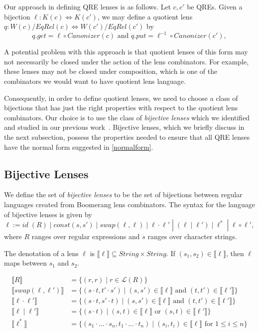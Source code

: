 \documentclass{svproc}
\newcommand{\sep}{\ensuremath{\; | \;}}
\newcommand{\canonizer}{\ensuremath{\mathit{Canonizer}}}
\begin{document}
Our approach in defining QRE lenses is as follows. Let $c, c'$ be QREs. Given a
bijection $\ell : K(c) \Leftrightarrow K(c')$, we may define a quotient lens $q
: W(c)/EqRel(c) \Leftrightarrow W(c')/EqRel(c')$ by
\begin{equation}\label{normalform}
q.get = \ell \circ \canonizer(c) \text{ and } q.put = \ell^{-1} \circ
\canonizer(c'),
\end{equation}

A potential problem with this approach is that quotient lenses of this form may
not necessarily be closed under the action of the lens combinators. For
example, these lenses may not be closed under composition, which is one of the
combinators we would want to have quotient lens language.

Consequently, in order to define quotient lenses, we need to choose a class of
bijections that has just the right properties with respect to the quotient
lens combinators. Our choice is to use the class of \textit{bijective
lenses} which we identified and studied in our previous work~\cite{popl18}.
Bijective lenses, which we briefly discuss in the next subsection, possess
the properties needed to ensure that all QRE lenses have the normal form
suggested in \cref{normalform}.

\subsection{Bijective Lenses}
We define the set of \textit{bijective lenses} to be the set of bijections
between regular languages created from Boomerang lens combinators.
The syntax for the language of bijective lenses is given by
$$\ell := \mathit{id} \; (R) \sep const(s, s') \sep  swap(\ell,
\ell) \sep \ell \cdot \ell' \; |  \; (\ell \sep \ell') \sep \ell^* \;
| \; \ell \circ \ell',$$ where $R$ ranges over regular expressions and $s$
ranges over character strings.

The denotation of a lens $\ell$ is $\llbracket \ell \rrbracket \subseteq
\mathit{String} \times \mathit{String}$. If $(s_1, s_2) \in \llbracket \ell
\rrbracket$, then $\ell$ maps between $s_1$ and $s_2$.

\begin{align*}
\llbracket R \rrbracket &= \{(r, r) \sep r \in \mathcal{L}(R)\}\\
\llbracket swap(\ell, \ell') \rrbracket &= \{(s \cdot t, t' \cdot s') \sep
(s, s') \in \llbracket \ell \rrbracket \text{ and } (t, t') \in \llbracket
\ell' \rrbracket\}\\
\llbracket \ell \cdot \ell' \rrbracket &= \{(s \cdot t, s' \cdot t) \sep
(s, s') \in \llbracket \ell \rrbracket \text{ and } (t, t') \in \llbracket
\ell' \rrbracket\}\\
\llbracket \ell \sep \ell' \rrbracket &= \{(s \cdot t) \sep
(s, t) \in \llbracket \ell \rrbracket \text{ or } (s, t) \in \llbracket
\ell' \rrbracket\}\\
\llbracket \ell^* \rrbracket &= \{(s_1 \cdot \ldots \cdot s_n, t_1 \cdot \ldots
\cdot t_n) \sep (s_i, t_i) \in \llbracket \ell \rrbracket \text{ for } 1
\leq i \leq n\}
\end{align*}
\end{document}
